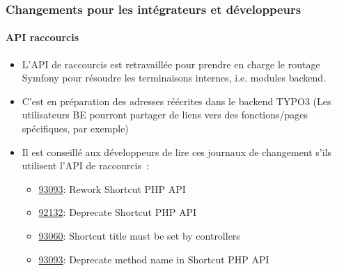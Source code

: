 %

\begin{frame}[fragile]
	\frametitle{Changements pour les intégrateurs et développeurs}
	\framesubtitle{API raccourcis}

	\begin{itemize}
		\item L'API de raccourcis est retravaillée pour prendre en charge le routage Symfony
			pour résoudre les terminaisons internes, i.e. modules backend.
		\item C'est en préparation des adresses réécrites dans le backend TYPO3\newline
			\small(Les utilisateurs BE pourront partager de liens vers des fonctions/pages spécifiques,
			par exemple)\normalsize
		\item Il est conseillé aux développeurs de lire ces journaux de changement s'ils utilisent
			l'API de raccourcis~:

			\begin{itemize}
				\item \href{https://docs.typo3.org}{93093}: Rework Shortcut PHP API
				\item \href{https://docs.typo3.org}{92132}: Deprecate Shortcut PHP API
				\item \href{https://docs.typo3.org}{93060}: Shortcut title must be set by controllers
				\item \href{https://docs.typo3.org}{93093}: Deprecate method name in Shortcut PHP API
			\end{itemize}

	\end{itemize}

\end{frame}

